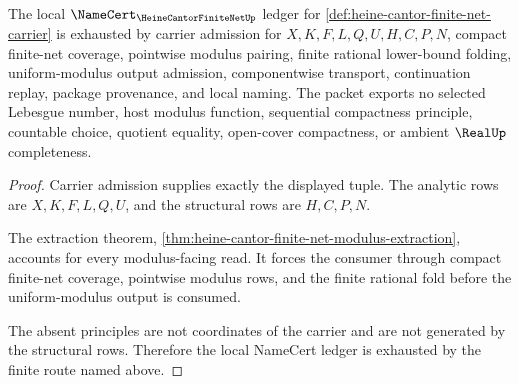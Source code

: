 \begin{theorem}
\label{thm:heine-cantor-finite-net-ledger-exhaustion}
The local $\NameCert_{\HeineCantorFiniteNetUp}$ ledger for \autoref{def:heine-cantor-finite-net-carrier} is exhausted by carrier admission for $X,K,F,L,Q,U,H,C,P,N$, compact finite-net coverage, pointwise modulus pairing, finite rational lower-bound folding, uniform-modulus output admission, componentwise transport, continuation replay, package provenance, and local naming. The packet exports no selected Lebesgue number, host modulus function, sequential compactness principle, countable choice, quotient equality, open-cover compactness, or ambient $\RealUp$ completeness.
\end{theorem}
\begin{proof}
Carrier admission supplies exactly the displayed tuple. The analytic rows are $X,K,F,L,Q,U$, and the structural rows are $H,C,P,N$.

The extraction theorem, \autoref{thm:heine-cantor-finite-net-modulus-extraction}, accounts for every modulus-facing read. It forces the consumer through compact finite-net coverage, pointwise modulus rows, and the finite rational fold before the uniform-modulus output is consumed.

The absent principles are not coordinates of the carrier and are not generated by the structural rows. Therefore the local NameCert ledger is exhausted by the finite route named above.
\end{proof}


\begin{closurestatus}{\HeineCantorFiniteNetUp}
  \theoryclosure{\seedClosure}
  \formalstatus{\unformalizedV}
\end{closurestatus}
